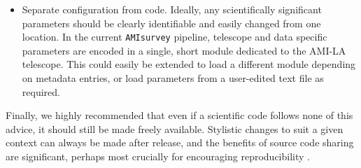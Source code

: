 \documentclass[5p,authoryear]{elsarticle}
\begin{document}
\begin{itemize}
 \item Separate configuration from code.
   Ideally, any scientifically significant parameters should be clearly identifiable and easily changed from one location. 
   In the current \texttt{AMIsurvey} pipeline, telescope and data specific parameters are encoded in a single, short module dedicated to the AMI-LA telescope. 
   This could easily be extended to load a different module depending on metadata entries, or load parameters from a user-edited text file as required.
\end{itemize}

Finally, we highly recommended that even if a scientific code follows none of this advice, it should still be made freely available. 
Stylistic changes to suit a given context can always be made after release, and the benefits of source code sharing are significant, perhaps most crucially for encouraging reproducibility \citep[see e.g.][for further discussion]{Shamir2013}.
\end{document}
